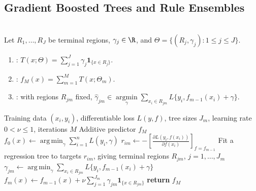 \subsection{Gradient Boosted Trees and Rule Ensembles}
\begin{definition} \label{def:sl-additive-tree-expansion} \\
Let $R_1,\ldots,R_J$ be terminal regions, $\gamma_j\in\R$, and $\Theta=\{(R_j,\gamma_j):1\le j\le J\}$.
\begin{enumerate}[label=(\roman*)]
\setlength{\itemsep}{0pt}
\item {}: $T(x;\Theta)=\sum\limits_{j=1}^J\gamma_j\mathbf{1}_{\{x\in R_j\}}$.
\item {}: $f_M(x)=\sum\limits_{m=1}^M T(x;\Theta_m)$.
\item {}: with regions $R_{jm}$ fixed, $\widehat{\gamma}_{jm}\in\operatorname*{argmin}\limits_{\gamma}\sum\limits_{x_i\in R_{jm}}L\{y_i,f_{m-1}(x_i)+\gamma\}$.
\end{enumerate}
\end{definition}

\begin{breakablealgorithm}
\caption{Gradient Tree Boosting}
\label{alg:sl-gradient-tree-boosting}
\begin{algorithmic}
\Require Training data $(x_i,y_i)$, differentiable loss $L(y,f)$, tree sizes $J_m$, learning rate $0<\nu\leq1$, iterations $M$
\Ensure Additive predictor $f_M$
\State $\displaystyle f_0(x)\gets\operatorname*{arg\,min}_{\gamma}\sum_{i=1}^n L(y_i,\gamma)$
\State $\displaystyle r_{im}\gets-\left[\frac{\partial L(y_i,f(x_i))}{\partial f(x_i)}\right]_{f=f_{m-1}}$
\EndFor
\State Fit a regression tree to targets $r_{im}$, giving terminal regions $R_{jm}$, $j=1,\ldots,J_m$
\State $\displaystyle \gamma_{jm}\gets
\operatorname*{arg\,min}_{\gamma}
\sum_{x_i\in R_{jm}}L\{y_i,f_{m-1}(x_i)+\gamma\}$
\EndFor
\State $\displaystyle f_m(x)\gets f_{m-1}(x)+
\nu\sum_{j=1}^{J_m}\gamma_{jm}\mathbf{1}_{\{x\in R_{jm}\}}$
\EndFor
\State \textbf{return} $f_M$
\end{algorithmic}
\end{breakablealgorithm}

